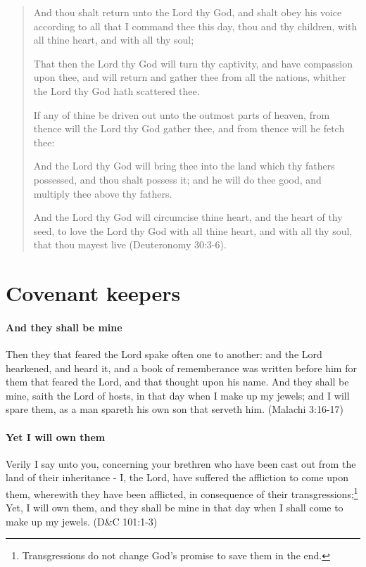\begin{quotation}
And thou shalt return unto the Lord thy God, and shalt obey his voice according to all that I command thee this day, thou and thy children, with all thine heart, and with all thy soul;

That then the Lord thy God will turn thy captivity, and have compassion upon thee, and will return and gather thee from all the nations, whither the Lord thy God hath scattered thee. 

If any of thine be driven out unto the outmost parts of heaven, from thence will the Lord thy God gather thee, and from thence will he fetch thee:

And the Lord thy God will bring thee into the land which thy fathers possessed, and thou shalt possess it; and he will do thee good, and multiply thee above thy fathers.

And the Lord thy God will circumcise thine heart, and the heart of thy seed, to love the Lord thy God with all thine heart, and with all thy soul, that thou mayest live (Deuteronomy 30:3-6).
\end{quotation}

\section{Covenant keepers}

\paragraph{And they shall be mine}
Then they that feared the Lord spake often one to another: and the Lord hearkened, and heard it, and a book of rememberance was written before him for them that feared the Lord, and that thought upon his name. And they shall be mine, saith the Lord of hosts, in that day when I make up my jewels; and I will spare them, as a man spareth his own son that serveth him. (Malachi 3:16-17)

\paragraph{Yet I will own them}
Verily I say unto you, concerning your brethren who have been cast out from the land of their inheritance - I, the Lord, have suffered the affliction to come upon them, wherewith they have been afflicted, in consequence of their transgressions;\footnote{Transgressions do not change God's promise to save them in the end.} Yet, I will own them, and they shall be mine in that day when I shall come to make up my jewels. (D\&C 101:1-3)

